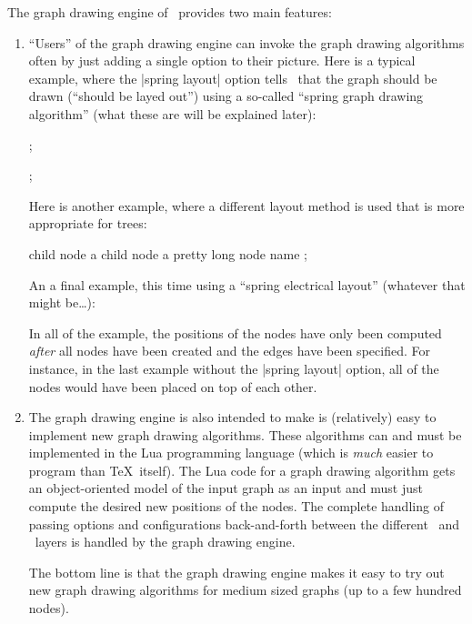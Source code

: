 The graph drawing engine of \tikzname\ provides two main features:
\begin{enumerate}
\item ``Users'' of the graph drawing engine can invoke the graph
  drawing algorithms often by just adding a single option to their
  picture. Here is a typical example, where the |spring layout| option
  tells \tikzname\ that the graph should be drawn (``should be layed
  out'') using a so-called ``spring graph drawing algorithm'' (what
  these are will be explained later):
\begin{codeexample}[]
\tikz {};

\tikz {};
\end{codeexample}
  Here is another example, where a different layout method is used
  that is more appropriate for trees:
\begin{codeexample}[]
  child { node {a} }
  child { node {a pretty long node name} };
\end{codeexample}
  An a final example, this time using a ``spring electrical layout''
  (whatever that might be\dots):
\begin{codeexample}[]
\end{codeexample}
  In all of the example, the positions of the nodes have only been
  computed \emph{after} all nodes have been created and the edges have
  been specified. For instance, in the last example without the
  |spring layout| option, all of the nodes would have been placed on
  top of each other.
\item The graph drawing engine is also intended to make is
  (relatively) easy to implement new graph drawing algorithms. These
  algorithms can and must be implemented in the Lua programming
  language (which is \emph{much} easier to program than \TeX\
  itself). The Lua code for a graph drawing algorithm gets an
  object-oriented model of the input graph as an input and must just
  compute the desired new positions of the nodes. The complete
  handling of passing options and configurations back-and-forth
  between the different \tikzname\ and \pgfname\ layers is handled by
  the graph drawing engine.

  The bottom line is that the graph drawing engine makes it easy
  to try out new graph drawing algorithms for medium sized graphs (up
  to a few hundred nodes).
\end{enumerate}

